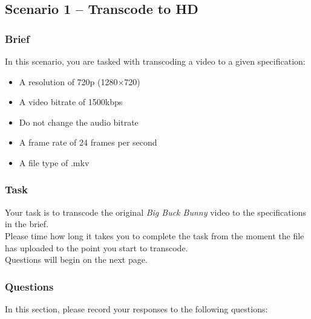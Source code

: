 \subsection{Scenario 1 – Transcode to HD}
\subsubsection{Brief}
In this scenario, you are tasked with transcoding a video to a given specification:
\begin{itemize}
    \item A resolution of 720p (1280×720)
    \item A video bitrate of 1500kbps
    \item Do not change the audio bitrate 
    \item A frame rate of 24 frames per second
    \item A file type of .mkv
\end{itemize}

\subsubsection{Task}
Your task is to transcode the original \emph{Big Buck Bunny} video to the specifications in the brief. \\
Please time how long it takes you to complete the task from the moment the file has uploaded to the point you start to transcode. \\
Questions will begin on the next page.

\clearpage

\subsubsection{Questions}

In this section, please record your responses to the following questions:
